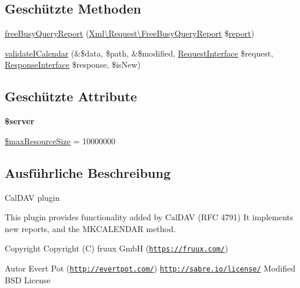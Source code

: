 \subsection*{Geschützte Methoden}
\begin{DoxyCompactItemize}
\item 
\mbox{\hyperlink{class_sabre_1_1_cal_d_a_v_1_1_plugin_a1bc2721445d98bd38226c76bdd15090d}{free\+Busy\+Query\+Report}} (\mbox{\hyperlink{class_sabre_1_1_cal_d_a_v_1_1_xml_1_1_request_1_1_free_busy_query_report}{Xml\textbackslash{}\+Request\textbackslash{}\+Free\+Busy\+Query\+Report}} \$\mbox{\hyperlink{class_sabre_1_1_cal_d_a_v_1_1_plugin_a0b4b1b8566b5cc8d024a46ecd47bc3c3}{report}})
\item 
\mbox{\hyperlink{class_sabre_1_1_cal_d_a_v_1_1_plugin_afe0a462ed34abd339d0dc2251171bb78}{validate\+I\+Calendar}} (\&\$data, \$path, \&\$modified, \mbox{\hyperlink{interface_sabre_1_1_h_t_t_p_1_1_request_interface}{Request\+Interface}} \$request, \mbox{\hyperlink{interface_sabre_1_1_h_t_t_p_1_1_response_interface}{Response\+Interface}} \$response, \$is\+New)
\end{DoxyCompactItemize}
\subsection*{Geschützte Attribute}
\begin{DoxyCompactItemize}
\item 
\mbox{\label{class_sabre_1_1_cal_d_a_v_1_1_plugin_ab23a2c9c1e873f4a40335e03bcfab9f0}} 
{\bfseries \$server}
\item 
\mbox{\hyperlink{class_sabre_1_1_cal_d_a_v_1_1_plugin_a437f516326ebdca89b96cdacdd697eb4}{\$max\+Resource\+Size}} = 10000000
\end{DoxyCompactItemize}


\subsection{Ausführliche Beschreibung}
Cal\+D\+AV plugin

This plugin provides functionality added by Cal\+D\+AV (R\+FC 4791) It implements new reports, and the M\+K\+C\+A\+L\+E\+N\+D\+AR method.

\begin{DoxyCopyright}{Copyright}
Copyright (C) fruux GmbH (\href{https://fruux.com/}{\tt https\+://fruux.\+com/}) 
\end{DoxyCopyright}
\begin{DoxyAuthor}{Autor}
Evert Pot (\href{http://evertpot.com/}{\tt http\+://evertpot.\+com/})  \href{http://sabre.io/license/}{\tt http\+://sabre.\+io/license/} Modified B\+SD License 
\end{DoxyAuthor}


